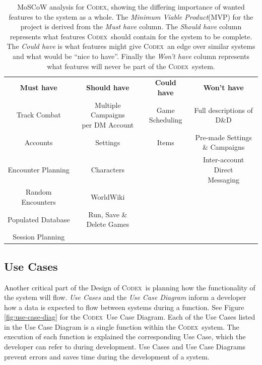 \documentclass[progress]{cmpreport}
\newcommand{\Codex}{\textsc{Codex}}
\begin{document}
		\begin{table}
			\centering
			\begin{tabular}{|c|c|c|c|}
				\hline
				\textbf{Must have} 					& \textbf{Should have}              	& \textbf{Could have} & \textbf{Won't have}             	  \\ \hhline{|=|=|=|=|}
				Track Combat      					&\makecell{Multiple Campaigns \\ per DM Account}	& \makecell{Game \\ Scheduling}     & \makecell{Full descriptions of \\ D\&D} \\ \hline
				Accounts          					& Settings								& Items               & \makecell{Pre-made Settings \\ \& Campaigns}\\ \hline
				Encounter Planning 					& Characters                        	&                     & \makecell{Inter-account Direct \\ Messaging} \\ \hline
				Random Encounters  					& WorldWiki                        		&                     &                                	  \\ \hline
				Populated Database 					& \makecell{Run, Save \& \\ Delete Games} 			&                     &                                   \\ \hline
				Session Planning					&         								&                     &                                   \\ \hline
			\end{tabular}
			\caption{MoSCoW analysis for \Codex, showing the differing importance of wanted features to the system as a whole. The \emph{Minimum Viable Product}(MVP) for the project is derived from the \emph{Must have} column. The \emph{Should have} column represents what features \Codex \ should contain for the system to be complete. The \emph{Could have} is what features might give \Codex \ an edge over similar systems and what would be ``nice to have''. Finally the \emph{Won't have} column represents what features will never be part of the \Codex \ system.}\label{tab:MoSCoW}
		\end{table}
	
		\subsection{Use Cases} \label{sec:use-cases}
		Another critical part of the Design of \Codex \ is planning how the functionality of the system will flow. \emph{Use Cases} and the \emph{Use Case Diagram } inform a developer how a data is expected to flow between systems during a function. See Figure \ref{fig:use-case-diag} for the \Codex \ Use Case Diagram. Each of the Use Cases listed in the Use Case Diagram is a single function within the \Codex \ system. The execution of each function is explained the corresponding Use Case, which the developer can refer to during development. Use Cases and Use Case Diagrams prevent errors and saves time during the development of a system.
		
\end{document}
